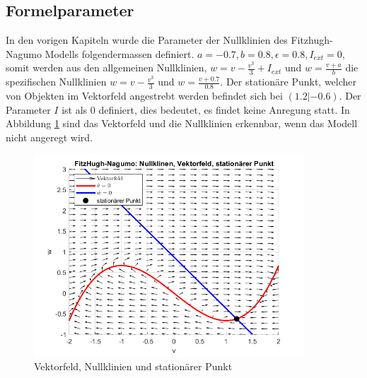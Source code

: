 \begin{refsection}
\subsection{Formelparameter}
In den vorigen Kapiteln wurde die Parameter der Nullklinien des Fitzhugh-Nagumo Modells folgendermassen definiert.
\(a = -0.7, b = 0.8, \epsilon = 0.8, I_{ext} = 0\), somit werden aus den allgemeinen Nullklinien, \( w = v - \frac{v^3}{3} + I_{ext}\)
und \(w = \frac{v + a}{b}\) die spezifischen Nullklinien \( w = v - \frac{v^3}{3}\)
und \(w = \frac{v + 0.7}{0.8}\).
Der stationäre Punkt, welcher von Objekten im Vektorfeld angestrebt werden befindet sich bei $(1.2 |-0.6)$.
Der Parameter $I$ ist als 0 definiert, dies bedeutet, es findet keine Anregung statt.
In Abbildung \ref{fig:Parameter} sind das Vektorfeld und die Nullklinien erkennbar, wenn das Modell nicht angeregt wird.
\begin{figure}[h]
    \centering
    \includegraphics[width=0.9\textwidth]{papers/nerven/Bilder/Anregung1.png}
    \caption{Vektorfeld, Nullklinien und stationärer Punkt}
    \label{fig:Parameter}
\end{figure}

\end{refsection}
